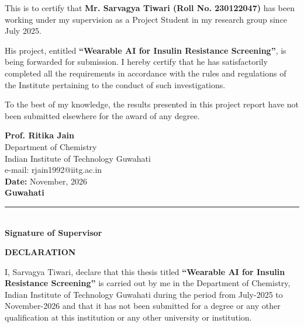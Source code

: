 \documentclass[12pt,a4paper,oneside]{report}
\begin{document}
\noindent
\large
This is to certify that \textbf{Mr. Sarvagya Tiwari (Roll No. 230122047)} has been working under my supervision as a Project Student in my research group since July 2025.

\vspace{0.45cm}
\noindent
His project, entitled \textbf{“Wearable AI for Insulin Resistance Screening”}, is being forwarded for submission. I hereby certify that he has satisfactorily completed all the requirements in accordance with the rules and regulations of the Institute pertaining to the conduct of such investigations.

\vspace{0.45cm}
\noindent
To the best of my knowledge, the results presented in this project report have not been submitted elsewhere for the award of any degree.

\vspace{2.2cm}

\noindent
\begin{minipage}[t]{0.55\textwidth}
    \textbf{Prof. Ritika Jain}\\
    Department of Chemistry\\
    Indian Institute of Technology Guwahati\\
    e-mail: rjain1992@iitg.ac.in\\[0.3cm]
    \textbf{Date:} November, 2026\\
    \textbf{Guwahati}
\end{minipage}
\hfill
\begin{minipage}[t]{0.4\textwidth}
    \vspace{1.2cm}
    \rule{5.8cm}{0.4pt}\\
    \centering \textbf{Signature of Supervisor}
\end{minipage}

\normalsize
\newpage

\thispagestyle{plain}
\begin{center}
    {\huge \textbf{DECLARATION}}\\[1.4cm]
\end{center}

\noindent
\large
I, Sarvagya Tiwari, declare that this thesis titled \textbf{“Wearable AI for Insulin Resistance Screening”} is carried out by me in the Department of Chemistry, Indian Institute of Technology Guwahati during the period from July-2025 to November-2026 and that it has not been submitted for a degree or any other qualification at this institution or any other university or institution.
\end{document}
